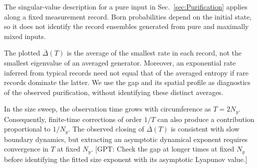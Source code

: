 \documentclass[aps,prb,10pt,twocolumn,superscriptaddress,longbibliography,floatfix]{revtex4-2}
\newcommand{\GPT}[1]{{\color{magenta}[GPT: #1]}}
\begin{document}
{The singular-value description for a pure input in Sec.~\ref{sec:Purification} applies along a fixed measurement record. Born probabilities depend on the initial state, so it does not identify the record ensembles generated from pure and maximally mixed inputs.

The plotted $\overline{\Delta}(T)$ is the average of the smallest rate in each record, not the smallest eigenvalue of an averaged generator. Moreover, an exponential rate inferred from typical records need not equal that of the averaged entropy if rare records dominate the latter. We use the gap and its spatial profile as diagnostics of the observed purification, without identifying these distinct averages.

In the size sweep, the observation time grows with circumference as $T=2N_y$. Consequently, finite-time corrections of order $1/T$ can also produce a contribution proportional to $1/N_y$. The observed closing of $\overline{\Delta}(T)$ is consistent with slow boundary dynamics, but extracting an asymptotic dynamical exponent requires convergence in $T$ at fixed $N_y$.
\GPT{Check the gap at longer times at fixed $N_y$ before identifying the fitted size exponent with its asymptotic Lyapunov value.}
}
\end{document}
